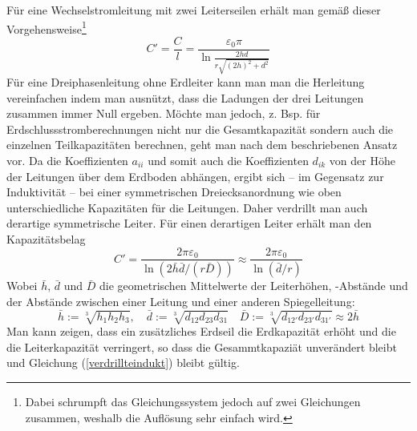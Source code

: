 Für eine Wechselstromleitung mit zwei Leiterseilen erhält man gemäß dieser Vorgehensweise\footnote{Dabei schrumpft das Gleichungssystem jedoch auf zwei Gleichungen zusammen, weshalb die Auflösung sehr einfach wird.}
\begin{equation}
C' = \frac{C}{l} = \frac{\varepsilon_0\pi}{\ln{\frac{2hd}{r\sqrt{\left(2h\right)^2+d^2}}}}
\end{equation}
Für eine Dreiphasenleitung ohne Erdleiter kann man man die Herleitung vereinfachen indem man ausnützt, dass die Ladungen der drei Leitungen zusammen immer Null ergeben. Möchte man jedoch, z. Bsp. für  Erdschlussstromberechnungen nicht nur die Gesamtkapazität sondern auch die einzelnen Teilkapazitäten berechnen, geht man nach dem beschriebenen Ansatz vor.
Da die Koeffizienten $a_{ii}$ und somit auch die Koeffizienten $d_{ik}$ von der Höhe der Leitungen über dem Erdboden abhängen, ergibt sich -- im Gegensatz zur Induktivität -- bei einer symmetrischen Dreiecksanordnung wie oben %
unterschiedliche Kapazitäten für die Leitungen. Daher verdrillt man auch derartige symmetrische Leiter. Für einen derartigen Leiter erhält man den Kapazitätsbelag
\begin{equation}\label{verdrillteindukt}
C' = \frac{2\pi\varepsilon_0}{\ln\left(2 \bar{h}\bar{d}/(r\bar{D})\right) } \approx
\frac{2\pi\varepsilon_0}{\ln\left(\bar{d}/r\right)}
\end{equation}
Wobei $\bar{h}$, $\bar{d}$ und $\bar{D}$ die geometrischen Mittelwerte der Leiterhöhen, -Abstände und der Abstände zwischen einer Leitung und einer anderen \q Spiegelleitung\q : %
\begin{equation}
\bar{h} := \sqrt[3]{h_1h_2h_3}, \quad \bar{d} := \sqrt[3]{d_{12}d_{23}d_{31}} \quad \bar{D} := \sqrt[3]{d_{12'}d_{23'}d_{31'}} \approx 2\bar{h}
\end{equation}
Man kann zeigen, dass ein zusätzliches Erdseil die Erdkapazität erhöht und die die Leiterkapazität verringert, so dass die Gesammtkapaziät unverändert bleibt und Gleichung (\ref{verdrillteindukt}) bleibt gültig.\cite{Flosdorff}


